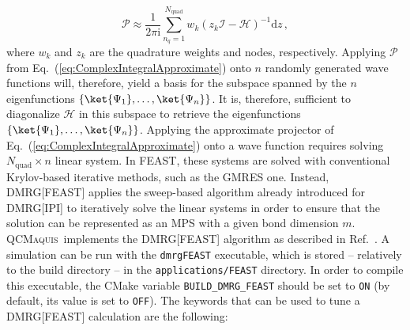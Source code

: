\documentclass[bibliography=totoc,12pt,a4paper]{scrartcl}
\newcommand{\qcm}{\textsc{QCMaquis}}
\begin{document}
\begin{equation}
  \mathcal{P} \approx \frac{1}{2\pi\mathrm{i}} \sum_{n_q=1}^{N_\text{quad}}
	w_k \left( z_k \mathcal{I} - \mathcal{H} \right)^{-1} \mathrm{d}z \, ,
  \label{eq:ComplexIntegralApproximate}
\end{equation}
%
where $w_k$ and $z_k$ are the quadrature weights and nodes, respectively.
Applying $\mathcal{P}$ from Eq.~(\ref{eq:ComplexIntegralApproximate}) onto $n$ randomly generated wave functions will, therefore, yield a basis for the subspace spanned by the $n$ eigenfunctions $\left\{ \ket{\Psi_1}, \ldots, \ket{\Psi_n} \right\}$.
It is, therefore, sufficient to diagonalize $\mathcal{H}$ in this subspace to retrieve the eigenfunctions $\left\{ \ket{\Psi_1}, \ldots, \ket{\Psi_n} \right\}$.
Applying the approximate projector of Eq.~(\ref{eq:ComplexIntegralApproximate}) onto a wave function requires solving $N_\text{quad} \times n$ linear system.
In FEAST, these systems are solved with conventional Krylov-based iterative methods, such as the GMRES one.
Instead, DMRG[FEAST] applies the sweep-based algorithm already introduced for DMRG[IPI] to iteratively solve the linear systems in order to ensure that the solution can be represented as an MPS with a given bond dimension $m$. \\

\qcm\ implements the DMRG[FEAST] algorithm as described in Ref.~.
A simulation can be run with the \texttt{dmrgFEAST} executable, which is stored -- relatively to the build directory -- in the \texttt{applications/FEAST} directory.
In order to compile this executable, the CMake variable \texttt{BUILD\_DMRG\_FEAST} should be set to \texttt{ON} (by default, its value is set to \texttt{OFF}).
The keywords that can be used to tune a DMRG[FEAST] calculation are the following:
\end{document}
